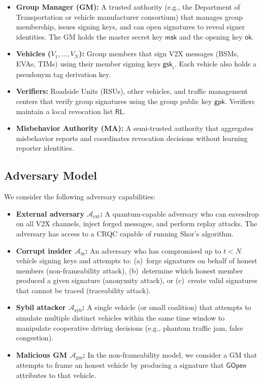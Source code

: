 \documentclass[conference,10pt]{IEEEtran}
\newcommand{\GM}{\textsf{GM}}
\newcommand{\MA}{\textsf{MA}}
\newcommand{\advA}{\mathcal{A}}
\begin{document}
\begin{itemize}
    \item \textbf{Group Manager (\GM{}):} A trusted authority (e.g., the Department of Transportation or vehicle manufacturer consortium) that manages group membership, issues signing keys, and can open signatures to reveal signer identities. The GM holds the master secret key $\mathsf{msk}$ and the opening key $\mathsf{ok}$.

    \item \textbf{Vehicles ($V_1, \ldots, V_N$):} Group members that sign V2X messages (BSMs, EVAs, TIMs) using their member signing keys $\mathsf{gsk}_i$. Each vehicle also holds a pseudonym tag derivation key.

    \item \textbf{Verifiers:} Roadside Units (RSUs), other vehicles, and traffic management centers that verify group signatures using the group public key $\mathsf{gpk}$. Verifiers maintain a local revocation list $\mathsf{RL}$.

    \item \textbf{Misbehavior Authority (\MA{}):} A semi-trusted authority that aggregates misbehavior reports and coordinates revocation decisions without learning reporter identities.
\end{itemize}

\subsection{Adversary Model}

We consider the following adversary capabilities:

\begin{itemize}
    \item \textbf{External adversary $\advA_{\mathrm{ext}}$:} A quantum-capable adversary who can eavesdrop on all V2X channels, inject forged messages, and perform replay attacks. The adversary has access to a CRQC capable of running Shor's algorithm.

    \item \textbf{Corrupt insider $\advA_{\mathrm{in}}$:} An adversary who has compromised up to $t < N$ vehicle signing keys and attempts to: (a)~forge signatures on behalf of honest members (non-frameability attack), (b)~determine which honest member produced a given signature (anonymity attack), or (c)~create valid signatures that cannot be traced (traceability attack).

    \item \textbf{Sybil attacker $\advA_{\mathrm{syb}}$:} A single vehicle (or small coalition) that attempts to simulate multiple distinct vehicles within the same time window to manipulate cooperative driving decisions (e.g., phantom traffic jam, false congestion).

    \item \textbf{Malicious GM $\advA_{\mathrm{gm}}$:} In the non-frameability model, we consider a GM that attempts to frame an honest vehicle by producing a signature that $\mathsf{GOpen}$ attributes to that vehicle.
\end{itemize}
\end{document}
